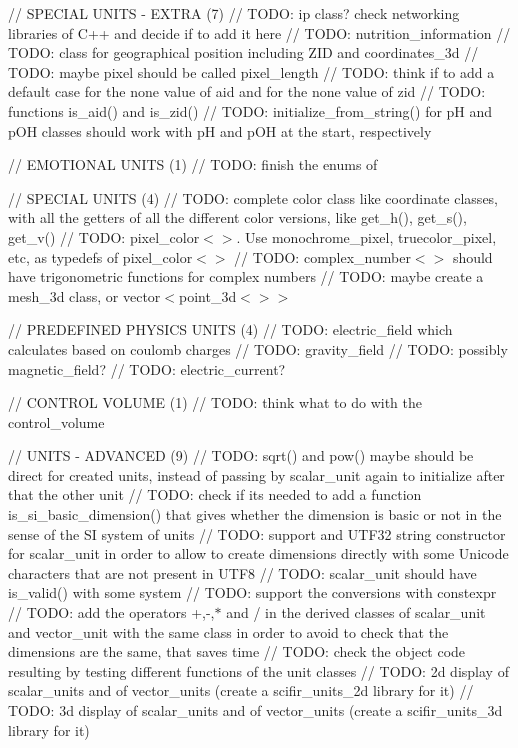 // SPECIAL UNITS -\/ EXTRA (7) // TODO\+: ip class? check networking libraries of C++ and decide if to add it here // TODO\+: nutrition\+\_\+information // TODO\+: class for geographical position including ZID and coordinates\+\_\+3d // TODO\+: maybe pixel should be called pixel\+\_\+length // TODO\+: think if to add a default case for the none value of aid and for the none value of zid // TODO\+: functions is\+\_\+aid() and is\+\_\+zid() // TODO\+: initialize\+\_\+from\+\_\+string() for pH and p\+OH classes should work with pH and p\+OH at the start, respectively

// EMOTIONAL UNITS (1) // TODO\+: finish the enums of 

// SPECIAL UNITS (4) // TODO\+: complete color class like coordinate classes, with all the getters of all the different color versions, like get\+\_\+h(), get\+\_\+s(), get\+\_\+v() // TODO\+: pixel\+\_\+color$<$$>$. Use monochrome\+\_\+pixel, truecolor\+\_\+pixel, etc, as typedefs of pixel\+\_\+color$<$$>$ // TODO\+: complex\+\_\+number$<$$>$ should have trigonometric functions for complex numbers // TODO\+: maybe create a mesh\+\_\+3d class, or vector$<$point\+\_\+3d$<$$>$$>$

// PREDEFINED PHYSICS UNITS (4) // TODO\+: electric\+\_\+field which calculates based on coulomb charges // TODO\+: gravity\+\_\+field // TODO\+: possibly magnetic\+\_\+field? // TODO\+: electric\+\_\+current?

// CONTROL VOLUME (1) // TODO\+: think what to do with the control\+\_\+volume

// UNITS -\/ ADVANCED (9) // TODO\+: sqrt() and pow() maybe should be direct for created units, instead of passing by scalar\+\_\+unit again to initialize after that the other unit // TODO\+: check if it\textquotesingle{}s needed to add a function is\+\_\+si\+\_\+basic\+\_\+dimension() that gives whether the dimension is basic or not in the sense of the SI system of units // TODO\+: support and UTF32 string constructor for scalar\+\_\+unit in order to allow to create dimensions directly with some Unicode characters that are not present in UTF8 // TODO\+: scalar\+\_\+unit should have is\+\_\+valid() with some system // TODO\+: support the conversions with constexpr // TODO\+: add the operators +,-\/,\texorpdfstring{$\ast$}{*} and / in the derived classes of scalar\+\_\+unit and vector\+\_\+unit with the same class in order to avoid to check that the dimensions are the same, that saves time // TODO\+: check the object code resulting by testing different functions of the unit classes // TODO\+: 2d display of scalar\+\_\+units and of vector\+\_\+units (create a scifir\+\_\+units\+\_\+2d library for it) // TODO\+: 3d display of scalar\+\_\+units and of vector\+\_\+units (create a scifir\+\_\+units\+\_\+3d library for it)

